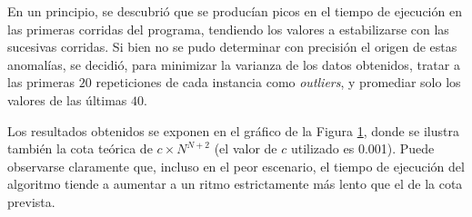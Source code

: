             En un principio, se descubrió que se producían picos en el tiempo de ejecución en las primeras corridas del programa, tendiendo los valores a estabilizarse con las sucesivas corridas. Si bien no se pudo determinar con precisión el origen de estas anomalías, se decidió, para minimizar la varianza de los datos obtenidos, tratar a las primeras $20$ repeticiones de cada instancia como \emph{outliers}, y promediar solo los valores de las últimas $40$.

            \renewcommand\constante{0.001}

            Los resultados obtenidos se exponen en el gráfico de la Figura \ref{fig:exp3:part_tiempo_base}, donde se ilustra también la cota teórica de $c \times N^{N + 2}$ (el valor de $c$ utilizado es \constante). Puede observarse claramente que, incluso en el peor escenario, el tiempo de ejecución del algoritmo tiende a aumentar a un ritmo estrictamente más lento que el de la cota prevista.

            \begin{figure}[H]
                \centering
                \caption{}
                \label{fig:exp3:part_tiempo_base}
            \end{figure}

